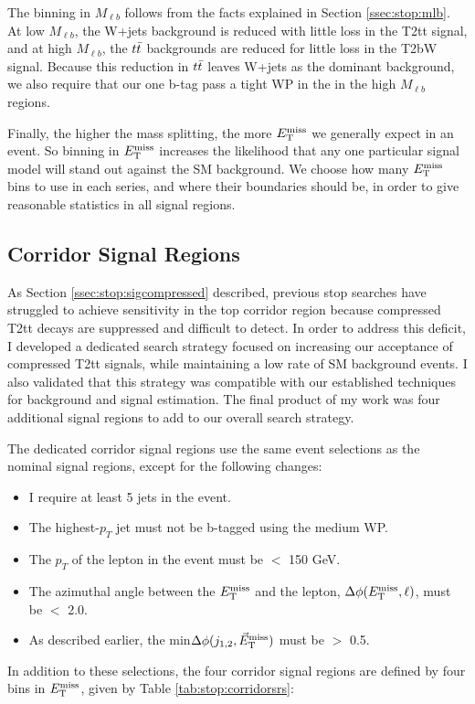 The binning in $M_{\ell b}$ follows from the facts explained in
Section \ref{ssec:stop:mlb}. At low $M_{\ell b}$, the W+jets
background is reduced with little loss in the T2tt signal, and at high
$M_{\ell b}$, the $t\bar{t}$ backgrounds are reduced for little loss in
the T2bW signal. Because this reduction in $t\bar{t}$ leaves W+jets as
the dominant background, we also require that our one b-tag pass a
tight WP in the in the high $M_{\ell b}$ regions.

Finally, the higher the mass splitting, the more $E_\text{T}^\text{miss}$ we generally
expect in an event. So binning in $E_\text{T}^\text{miss}$ increases the
likelihood that any one particular signal model will stand out against the
SM background. We choose how many $E_\text{T}^\text{miss}$ bins to use in each series,
and where their boundaries should be, in order to give reasonable
statistics in all signal regions.

\subsection{Corridor Signal Regions}
\label{ssec:stop:sigregscorridor}

As Section \ref{ssec:stop:sigcompressed} described, previous stop
searches have struggled to achieve sensitivity in the top corridor
region because compressed T2tt decays are suppressed and difficult to
detect. In order to address this deficit, I developed a dedicated
search strategy focused on increasing our acceptance of compressed
T2tt signals, while maintaining a low rate of SM background
events. I also validated that this strategy was compatible with our
established techniques for background and signal estimation. The final
product of my work was four additional signal
regions to add to our overall search strategy.

The dedicated corridor signal regions use the same event selections as
the nominal signal regions, except for the following changes:
\begin{itemize}
\item I require at least 5 jets in the event.
\item The highest-$p_T$ jet must not be b-tagged using the medium WP.
\item The $p_T$ of the lepton in the event must be $<$ 150 GeV.
\item The azimuthal angle between the $E_\text{T}^\text{miss}$ and the lepton, $\Delta
  \phi (E_\text{T}^\text{miss}, \ell)$, must be $<$ 2.0.
\item As described earlier, the min$\Delta \phi(j_{1,2},\vec{E}_\text{T}^\text{miss})$
  must be $>$ 0.5.
\end{itemize}
In addition to these selections, the four corridor signal regions are
defined by four bins in $E_\text{T}^\text{miss}$, given by Table \ref{tab:stop:corridorsrs}:

